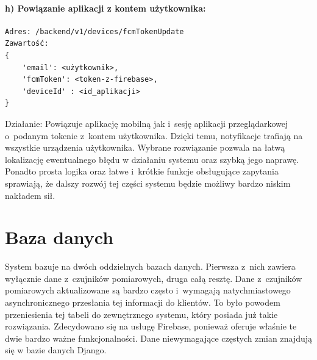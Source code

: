 \paragraph{h) Powiązanie aplikacji z kontem użytkownika:}
\begin{verbatim}
Adres: /backend/v1/devices/fcmTokenUpdate
Zawartość: 
{
	'email': <użytkownik>, 
	'fcmToken': <token-z-firebase>, 
	'deviceId' : <id_aplikacji>
}
\end{verbatim}
Działanie: Powiązuje aplikację mobilną jak i~sesję aplikacji przeglądarkowej o~podanym tokenie z~kontem użytkownika. Dzięki temu, notyfikacje trafiają na wszystkie urządzenia użytkownika.
\newline
\newline
Wybrane rozwiązanie pozwala na łatwą lokalizację ewentualnego błędu w działaniu systemu oraz szybką jego naprawę. Ponadto prosta logika oraz łatwe i~krótkie funkcje obsługujące zapytania sprawiają, że dalszy rozwój tej części systemu będzie możliwy bardzo niskim nakładem sił. 

\section{Baza danych}
System bazuje na dwóch oddzielnych bazach danych. Pierwsza z~nich zawiera wyłącznie dane z~czujników pomiarowych, druga całą resztę. Dane z~czujników pomiarowych aktualizowane są bardzo często i~wymagają natychmiastowego asynchronicznego przesłania tej informacji do klientów. To było powodem przeniesienia tej tabeli do zewnętrznego systemu, który posiada już takie rozwiązania. Zdecydowano się na usługę Firebase, ponieważ oferuje właśnie te dwie bardzo ważne funkcjonalności.  Dane niewymagające częstych zmian znajdują się w bazie danych Django.

